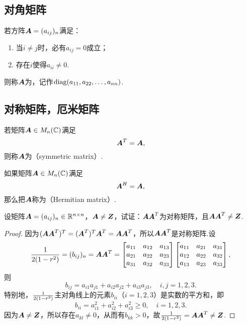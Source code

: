 \subsection{对角矩阵}
\begin{definition}
若方阵\(\boldsymbol{A}=(a_{ij})_n\)满足：
\begin{enumerate}
\item 当\(i \neq j\)时，必有\(a_{ij} = 0\)成立；
\item 存在\(i\)使得\(a_{ii} \neq 0\).
\end{enumerate}
则称\(\boldsymbol{A}\)为，记作\(\operatorname{diag}(a_{11},a_{22},\dotsc,a_{nn})\).
\end{definition}

\subsection{对称矩阵，厄米矩阵}
\begin{definition}
若矩阵\(\boldsymbol{A} \in M_n(\mathbb{C})\)满足\[
    \boldsymbol{A}^T = \boldsymbol{A},
\]
则称\(\boldsymbol{A}\)为（symmetric matrix）.
\end{definition}

\begin{definition}
如果矩阵\(\boldsymbol{A} \in M_n(\mathbb{C})\)满足\[
    \boldsymbol{A}^H = \boldsymbol{A},
\]
那么把\(\boldsymbol{A}\)称为（Hermitian matrix）.
\end{definition}


\begin{example}
设矩阵\(\boldsymbol{A} = (a_{ij})_n \in \mathbb{R}^{n \times n}\)，\(\boldsymbol{A} \neq \boldsymbol{Z}\)，试证：\(\boldsymbol{A} \boldsymbol{A}^T\)为对称矩阵，且\(\boldsymbol{A} \boldsymbol{A}^T \neq \boldsymbol{Z}\).
\begin{proof}
因为\((\boldsymbol{A} \boldsymbol{A}^T)^T = (\boldsymbol{A}^T)^T \boldsymbol{A}^T = \boldsymbol{A} \boldsymbol{A}^T\)，所以\(\boldsymbol{A} \boldsymbol{A}^T\)是对称矩阵.设\[
\frac{1}{2(1-r^2)} = (b_{ij})_n = \boldsymbol{A} \boldsymbol{A}^T = \begin{bmatrix}
a_{11} & a_{12} & a_{13} \\
a_{21} & a_{22} & a_{23} \\
a_{31} & a_{32} & a_{33} \\
\end{bmatrix} \begin{bmatrix}
a_{11} & a_{21} & a_{31} \\
a_{12} & a_{22} & a_{32} \\
a_{13} & a_{23} & a_{33} \\
\end{bmatrix},
\]则\[
b_{ij} = a_{i1} a_{j1} + a_{i2} a_{j2} + a_{i3} a_{j3},
\quad i,j=1,2,3.
\]特别地，\(\frac{1}{2(1-r^2)}\)主对角线上的元素\(b_{ii}\)（\(i=1,2,3\)）是实数的平方和，即\[
b_{ii} = a_{i1}^2 + a_{i2}^2 + a_{i3}^2 \geq 0,
\quad i=1,2,3.
\]因为\(\boldsymbol{A} \neq \boldsymbol{Z}\)，所以存在\(a_{kl} \neq 0\)，从而有\(b_{kk} > 0\)，故\(\frac{1}{2(1-r^2)} = \boldsymbol{A} \boldsymbol{A}^T \neq \boldsymbol{Z}\).
\end{proof}
\end{example}

